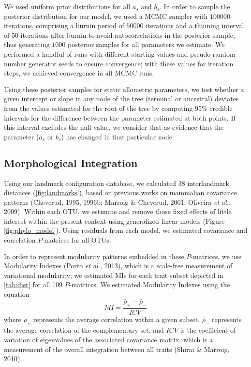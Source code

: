 \documentclass[12pt,]{article}
\begin{document}
We used uniform prior distributions for all $a_s$ and $b_s$. In order to
sample the posterior distribution for our model, we used a MCMC sampler
with $100000$ iterations, comprising a burnin period of $50000$
iterations and a thinning interval of $50$ iterations after burnin to
avoid autocorrelations in the posterior sample, thus generating $1000$
posterior samples for all parameters we estimate. We performed a handful
of runs with different starting values and pseudo-random number
generator seeds to ensure convergence; with these values for iteration
steps, we achieved convergence in all MCMC runs.

Using these posterior samples for static allometric parameters, we test
whether a given intercept or slope in any node of the tree (terminal or
ancestral) deviates from the values estimated for the root of the tree
by computing 95\% credible intervals for the difference between the
parameter estimated at both points. If this interval excludes the null
value, we consider that as evidence that the parameter ($a_s$ or $b_s$)
has changed in that particular node.

\subsection{Morphological Integration}\label{morphological-integration}

Using our landmark configuration database, we calculated 38
interlandmark distances (\autoref{fig:landmarks}), based on previous
works on mammalian covariance patterns (Cheverud, 1995, 1996b; Marroig
\& Cheverud, 2001; Oliveira \emph{et al.}, 2009). Within each OTU, we
estimate and remove those fixed effects of little interest within the
present context using generalized linear models (Figure
\ref{fig:phylo_model}). Using residuals from each model, we estimated
covariance and correlation $P$-matrices for all OTUs.

In order to represent modularity patterns embedded in these
$P$-matrices, we use Modularity Indexes (Porto \emph{et al.}, 2013),
which is a scale-free measurement of variational modularity; we
estimated MIs for each trait subset depicted in \autoref{tab:dist} for
all 109 $P$-matrices. We estimated Modularity Indexes using the equation
\[
MI = \frac {\bar{\rho}_{+} - \bar{\rho}_{-}} {ICV}
\] where $\bar{\rho}_{+}$ represents the average correlation within a
given subset, $\bar{\rho}_{-}$ represents the average correlation of the
complementary set, and $ICV$ is the coefficient of variation of
eigenvalues of the associated covariance matrix, which is a measurement
of the overall integration between all traits (Shirai \& Marroig, 2010).
\end{document}
